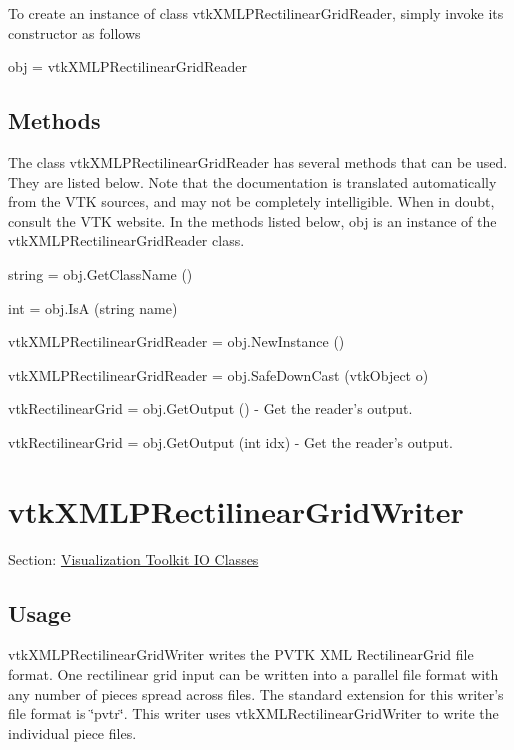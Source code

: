 To create an instance of class vtk\-X\-M\-L\-P\-Rectilinear\-Grid\-Reader, simply invoke its constructor as follows \begin{DoxyVerb}  obj = vtkXMLPRectilinearGridReader
\end{DoxyVerb}
 \hypertarget{vtkwidgets_vtkxyplotwidget_Methods}{}\subsection{Methods}\label{vtkwidgets_vtkxyplotwidget_Methods}
The class vtk\-X\-M\-L\-P\-Rectilinear\-Grid\-Reader has several methods that can be used. They are listed below. Note that the documentation is translated automatically from the V\-T\-K sources, and may not be completely intelligible. When in doubt, consult the V\-T\-K website. In the methods listed below, {\ttfamily obj} is an instance of the vtk\-X\-M\-L\-P\-Rectilinear\-Grid\-Reader class. 
\begin{DoxyItemize}
\item {\ttfamily string = obj.\-Get\-Class\-Name ()}  
\item {\ttfamily int = obj.\-Is\-A (string name)}  
\item {\ttfamily vtk\-X\-M\-L\-P\-Rectilinear\-Grid\-Reader = obj.\-New\-Instance ()}  
\item {\ttfamily vtk\-X\-M\-L\-P\-Rectilinear\-Grid\-Reader = obj.\-Safe\-Down\-Cast (vtk\-Object o)}  
\item {\ttfamily vtk\-Rectilinear\-Grid = obj.\-Get\-Output ()} -\/ Get the reader's output.  
\item {\ttfamily vtk\-Rectilinear\-Grid = obj.\-Get\-Output (int idx)} -\/ Get the reader's output.  
\end{DoxyItemize}\hypertarget{vtkio_vtkxmlprectilineargridwriter}{}\section{vtk\-X\-M\-L\-P\-Rectilinear\-Grid\-Writer}\label{vtkio_vtkxmlprectilineargridwriter}
Section\-: \hyperlink{sec_vtkio}{Visualization Toolkit I\-O Classes} \hypertarget{vtkwidgets_vtkxyplotwidget_Usage}{}\subsection{Usage}\label{vtkwidgets_vtkxyplotwidget_Usage}
vtk\-X\-M\-L\-P\-Rectilinear\-Grid\-Writer writes the P\-V\-T\-K X\-M\-L Rectilinear\-Grid file format. One rectilinear grid input can be written into a parallel file format with any number of pieces spread across files. The standard extension for this writer's file format is \char`\"{}pvtr\char`\"{}. This writer uses vtk\-X\-M\-L\-Rectilinear\-Grid\-Writer to write the individual piece files.


